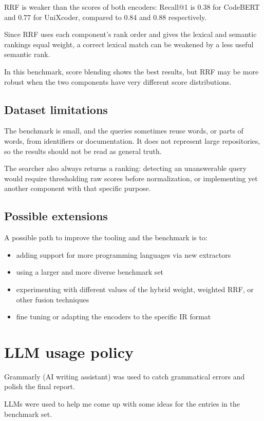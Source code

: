 \documentclass[12pt]{article}
\begin{document}
RRF is weaker than the scores of both encoders: Recall@1 is 0.38 for CodeBERT and 0.77 for UniXcoder, compared to 0.84 and 0.88 respectively.

Since RRF uses each component's rank order and gives the lexical and semantic rankings equal weight, a correct lexical match can be weakened by a less useful semantic rank.

In this benchmark, score blending shows the best results, but RRF may be more robust when the two components have very different score distributions.

\subsection{Dataset limitations}
\label{subsec:dataset-limits}

The benchmark is small, and the queries sometimes reuse words, or parts of words, from identifiers or documentation.
It does not represent large repositories, so the results should not be read as general truth.

The searcher also always returns a ranking: detecting an unanswerable query would require thresholding raw scores before normalization,
or implementing yet another component with that specific purpose.

\subsection{Possible extensions}
\label{subsec:extensions}

A possible path to improve the tooling and the benchmark is to:

\begin{itemize}
  \item adding support for more programming languages via new extractors
  \item using a larger and more diverse benchmark set
  \item experimenting with different values of the hybrid weight, weighted RRF, or other fusion techniques
  \item fine tuning or adapting the encoders to the specific IR format
\end{itemize}

\section{LLM usage policy}

Grammarly (AI writing assistant) was used to catch grammatical errors and polish the final report.

LLMs were used to help me come up with some ideas for the entries in the benchmark set.



\end{document}
